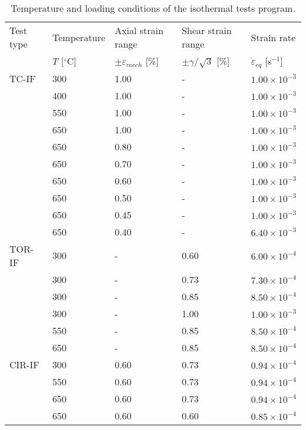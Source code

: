 \begin{table}[htbp]
  \centering
  \caption{Temperature and loading conditions of the isothermal tests program.}
    \begin{tabular}{p{2cm}p{2cm}p{3cm}p{3cm}p{2cm}}
    \toprule
    Test type & Temperature & Axial strain range & Shear strain range & Strain rate \\
          & $T$ [$^\circ$C] & $\pm \varepsilon _{mech}$ [\%] & $\pm \gamma/ \sqrt 3$ [\%] & $\dot \varepsilon _{eq}$ [s$^{-1}$] \\
    \midrule
    TC-IF    & 300   & 1.00  & -     & $1.00\times 10^{-3}$ \\
          & 400   & 1.00  & -     & $1.00\times 10^{-3}$ \\
          & 550   & 1.00  & -     & $1.00\times 10^{-3}$ \\
          & 650   & 1.00  & -     & $1.00\times 10^{-3}$ \\
          & 650   & 0.80  & -     & $1.00\times 10^{-3}$ \\
          & 650   & 0.70  & -     & $1.00\times 10^{-3}$ \\
          & 650   & 0.60  & -     & $1.00\times 10^{-3}$ \\
          & 650   & 0.50  & -     & $1.00\times 10^{-3}$ \\
          & 650   & 0.45  & -     & $1.00\times 10^{-3}$ \\
          & 650   & 0.40  & -     & $6.40\times 10^{-3}$ \\
    \midrule
    TOR-IF   & 300   & -     & 0.60  & $6.00\times 10^{-4}$ \\
          & 300   & -     & 0.73  & $7.30\times 10^{-4}$ \\
          & 300   & -     & 0.85  & $8.50\times 10^{-4}$ \\
          & 300   & -     & 1.00  & $1.00\times 10^{-3}$ \\
          & 550   & -     & 0.85  & $8.50\times 10^{-4}$ \\
          & 650   & -     & 0.85  & $8.50\times 10^{-4}$ \\
    \midrule
    CIR-IF  & 300   & 0.60  & 0.73  & $0.94\times 10^{-4}$ \\
          & 550   & 0.60  & 0.73  & $0.94\times 10^{-4}$ \\
          & 650   & 0.60  & 0.73  & $0.94\times 10^{-4}$ \\
          & 650   & 0.60  & 0.60  & $0.85\times 10^{-4}$ \\

\end{tabular}
\end{table}
